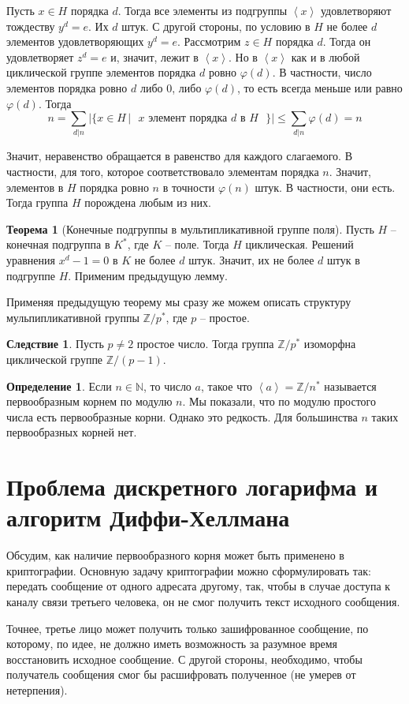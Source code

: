\documentclass[10pt,a4paper,oneside]{book}
\theoremstyle{definition}
\newtheorem*{defn}{\color{yellow!30!red} Определение}
\newtheorem{thm}{\color{red!40!black}Теорема}
\newtheorem{cor}{\color{green!45!black}Следствие}
\renewcommand{\leq}{\leqslant}
\newcommand{\mb}[1]{\mathbb{#1}}
\def\ffi{\varphi}
\def\lan{\left\langle }
\def\ran{\right\rangle}
\def\thrm{\begin{thm}}
\def\ethrm{\end{thm}}
\def\dfn{\begin{defn}}
\def\edfn{\end{defn}}
\def\crl{\begin{cor}}
\def\ecrl{\end{cor}}
\begin{document}
Пусть  $x\in H$ порядка $d$. Тогда все элементы из подгруппы $\lan x \ran$ удовлетворяют тождеству $y^d=e$. Их $d$ штук. С другой стороны, по условию в $H$ не более $d$ элементов удовлетворяющих $y^d=e$. Рассмотрим $z \in H$ порядка $d$. Тогда он удовлетворяет $z^d=e$ и, значит, лежит в $\lan x \ran$. Но в $\lan x \ran$ как и в любой циклической группе элементов порядка $d$ ровно $\ffi(d)$. В частности, число элементов порядка ровно $d$ либо $0$, либо $\varphi(d)$, то есть всегда меньше или равно $\varphi(d)$. Тогда
$$n = \sum_{d|n} |\{x \in H \,| \text{  $x$ элемент порядка $d$ в $H$ } \}|\leq \sum_{d|n}\varphi(d) =n$$

Значит, неравенство обращается в равенство для каждого слагаемого. В частности, для того, которое соответствовало элементам порядка $n$. Значит, элементов в $H$ порядка ровно $n$ в точности $\varphi(n)$ штук. В частности, они
есть. Тогда группа $H$ порождена любым из них.\endproof


\thrm[Конечные подгруппы в мультипликативной группе поля] Пусть $H$ -- конечная подгруппа в $K^*$, где $K$ -- поле. Тогда $H$ циклическая.
\proof Решений уравнения $x^d-1 = 0$ в $K$ не более $d$ штук. Значит, их не более $d$ штук в подгруппе $H$. Применим предыдущую лемму.
\endproof
\ethrm

Применяя предыдущую теорему мы сразу же можем описать структуру мульпипликативной группы $\mb Z/ p^*$, где $p$ -- простое.

\crl Пусть $p\neq 2$ простое число. Тогда группа $\mb Z/p^*$ изоморфна циклической группе $\mb Z/(p-1)$.
\ecrl

\dfn Если $n\in \mb N$, то число $a$, такое что $\lan a\ran =\mb Z/n^*$ называется первообразным корнем по модулю $n$. Мы показали, что по модулю простого числа есть первообразные корни. Однако это редкость. Для большинства $n$ таких первообразных корней нет.  
\edfn


\section{Проблема дискретного логарифма и алгоритм Диффи-Хеллмана}

Обсудим, как наличие первообразного корня может быть  применено в криптографии. Основную задачу криптографии можно сформулировать так: передать сообщение от одного адресата другому, так, чтобы в случае доступа к каналу связи третьего человека, он не смог получить текст исходного сообщения. 

Точнее, третье лицо может получить только зашифрованное сообщение, по которому, по идее, не должно иметь возможность за разумное время восстановить исходное сообщение. С другой стороны, необходимо, чтобы получатель сообщения смог бы расшифровать полученное (не умерев от нетерпения).
\end{document}
